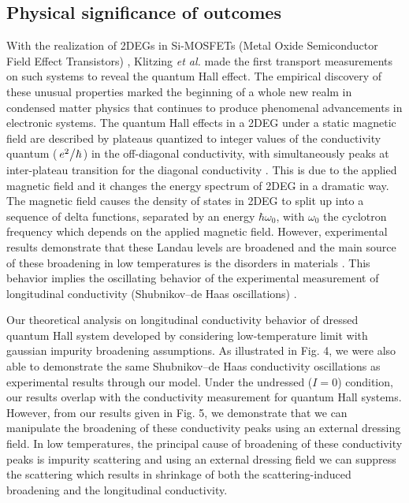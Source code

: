 \documentclass{article}
\begin{document}
{\color{Maroon}
\subsection*{Physical significance of outcomes}

With the realization of 2DEGs in Si-MOSFETs (Metal Oxide Semiconductor Field Effect Transistors) \cite{fowler66}, Klitzing \textit{et al.} \cite{klitzing80} made the first transport measurements on such systems to reveal the quantum Hall effect. The empirical discovery of these unusual properties marked the beginning of a whole new realm in condensed matter physics that continues to produce phenomenal advancements in electronic systems. The quantum Hall effects in a 2DEG under a static magnetic field are described by plateaus quantized to integer values of the conductivity quantum ($\flatfrac{e^2}{\hbar}$) in the off-diagonal conductivity, with simultaneously peaks at inter-plateau transition for the diagonal conductivity \cite{endo09}. This is due to the applied magnetic field and it changes the energy spectrum of 2DEG in a dramatic way. The magnetic field causes the density of states in 2DEG to split up into a sequence of delta functions, separated by an energy $\hbar\omega_0$, with $\omega_0$ the cyclotron frequency which depends on the applied magnetic field.
However, experimental results demonstrate that these Landau levels are broadened and the main source of these broadening in low temperatures is the disorders in materials \cite{ando85,dial07}. This behavior implies the oscillating behavior of the experimental measurement of longitudinal conductivity (Shubnikov–de Haas oscillations) \cite{endo09,wakabayashi78}.

Our theoretical analysis on longitudinal conductivity behavior of dressed quantum Hall system developed by considering low-temperature limit with gaussian impurity broadening assumptions. As illustrated in Fig. 4, we were also able to demonstrate the same Shubnikov–de Haas conductivity oscillations as experimental results \cite{endo09,wakabayashi78} through our model. Under the undressed ($I=0$) condition, our results overlap with the conductivity measurement for quantum Hall systems. However, from our results given in Fig. 5, we demonstrate that we can manipulate the broadening of these conductivity peaks using an external dressing field. In low temperatures, the principal cause of broadening of these conductivity peaks is impurity scattering and using an external dressing field we can suppress the scattering which results in shrinkage of both the scattering-induced broadening and the longitudinal conductivity.

}
\end{document}
